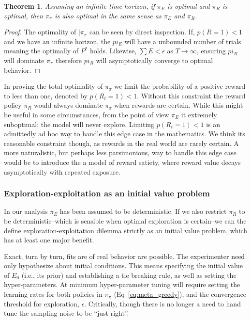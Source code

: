 \documentclass[9pt,twocolumn,twoside]{pnas-new}
\newtheorem{theorem}{Theorem}
\begin{document}
\begin{theorem} \label{theorem:meta}
    Assuming an infinite time horizon, if $\pi_E$ is optimal and $\pi_R$ is optimal, then $\pi_{\pi}$ is also optimal in the same sense as $\pi_E$ and $\pi_R$.
\end{theorem}
\begin{proof}
    The optimality of $|\pi_{\pi}$ can be seen by direct inspection. If, $p(R = 1) < 1$ and we have an infinite horizon, the $pi_E$ will have a unbounded number of trials meaning the optimally of $P^*$ holds. Likewise, $\sum E < \epsilon$ as $T \rightarrow \infty$, ensuring $pi_R$ will dominate $\pi_{\pi}$ therefore $pi_R$ will asymptotically converge to optimal behavior.
\end{proof}


In proving the total optimality of $\pi_{\pi}$ we limit the probability of a positive reward to less than one, denoted by $p(R_t = 1) < 1$. Without this constraint the reward policy $\pi_R$ would always dominate $\pi_{\pi}$ when rewards are certain. While this might be useful in some circumstances, from the point of view $\pi_E$ it extremely suboptimal; the model will never explore. Limiting $p(R_t = 1) < 1$ is an admittedly ad hoc way to handle this edge case in the mathematics. We think its reasonable constraint though, as rewards in the real world are rarely certain. A more naturalistic, but perhaps less parsimonious, way to handle this edge case would be to introduce the a model of reward satiety, where reward value decays asymptotically with repeated exposure. 

\subsubsection*{Exploration-exploitation as an initial value problem}
In our analysis $\pi_E$ has been assumed to be deterministic. If we also restrict $\pi_R$ to be deterministic--which is sensible when optimal exploration is certain--we can the define exploration-exploitation dilemma strictly as an initial value problem, which has at least one major benefit.

Exact, turn by turn, fits are of real behavior are possible. The experimenter need only hypothesize about initial conditions. This means specifying the initial value of $E_0$ (i.e., its prior) and establishing a tie breaking rule, as well as setting the hyper-parameters. At minimum hyper-parameter tuning will require setting the learning rates for both policies in $\pi_{\pi}$ (Eq~\ref{eq:meta_greedy}), and the convergence threshold for exploration, $\epsilon$. Critically, though there is no longer a need to hand tune the sampling noise to be ``just right''. %
\end{document}
